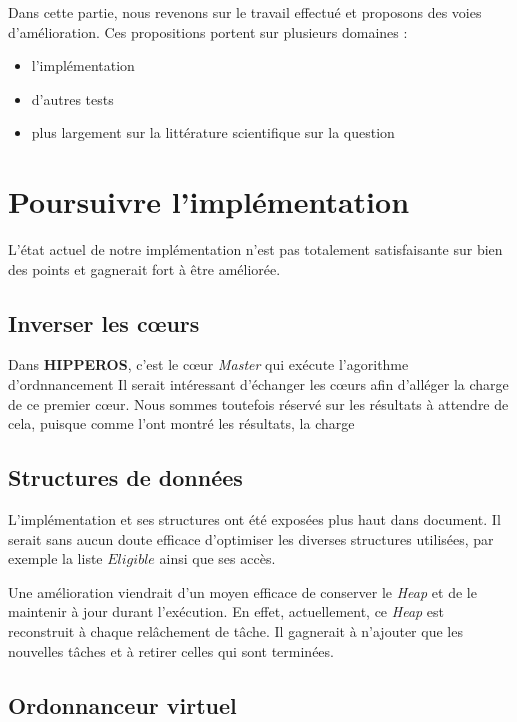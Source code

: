 Dans cette partie, nous revenons sur le travail effectué et proposons des voies d'amélioration.
Ces propositions portent sur plusieurs domaines :
\begin{itemize}
	\item l'implémentation
	\item d'autres tests
	\item plus largement sur la littérature scientifique sur la question
\end{itemize}

\section{Poursuivre l'implémentation}

	L'état actuel de notre implémentation n'est pas totalement satisfaisante sur bien des points et 
	gagnerait fort à être améliorée.
	
	\subsection{Inverser les cœurs}
		Dans \textbf{HIPPEROS}, c'est le cœur \textit{Master} qui exécute l'agorithme d'ordnnancement 
		Il serait intéressant d'échanger les cœurs afin d'alléger la charge de ce premier cœur. 
		Nous sommes toutefois réservé sur les résultats à attendre de cela, 
		puisque comme l'ont montré les résultats, la charge 
	
	\subsection{Structures de données}
		L'implémentation et ses structures ont été exposées plus haut dans document. 
		Il serait sans aucun doute efficace d'optimiser les diverses structures utilisées, par exemple 
		la liste $Eligible$ ainsi que ses accès. \newline
		
		Une amélioration viendrait d'un moyen efficace de conserver le \textit{Heap} et de le maintenir 
		à jour durant l'exécution. En effet, actuellement, ce \textit{Heap} est reconstruit à chaque 
		relâchement de tâche. Il gagnerait à n'ajouter que les nouvelles tâches et à retirer celles qui sont terminées.

	\subsection{Ordonnanceur virtuel}
	
